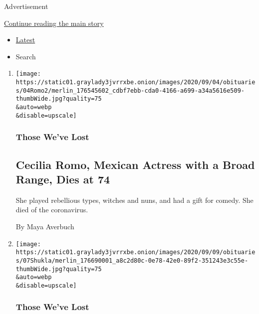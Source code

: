 Advertisement

\protect\hyperlink{after-mid2}{Continue reading the main story}

\begin{itemize}
\tightlist
\item
  \protect\hyperlink{stream-panel}{Latest}
\item
  Search
\end{itemize}

\begin{enumerate}
\def\labelenumi{\arabic{enumi}.}
\item
  \href{/2020/09/08/obituaries/cecilia-romo-dead-coronavirus.html}{}

  \texttt{[image: https://static01.graylady3jvrrxbe.onion/images/2020/09/04/obituaries/04Romo2/merlin\_176545602\_cdbf7ebb-cda0-4166-a699-a34a5616e509-thumbWide.jpg?quality=75\\\&auto=webp\\\&disable=upscale]}

  \hypertarget{those-weve-lost-1}{%
  \subsubsection{Those We've Lost}\label{those-weve-lost-1}}

  \hypertarget{cecilia-romo-mexican-actress-with-a-broad-range-dies-at-74}{%
  \subsection{Cecilia Romo, Mexican Actress with a Broad Range, Dies at
  74}\label{cecilia-romo-mexican-actress-with-a-broad-range-dies-at-74}}

  She played rebellious types, witches and nuns, and had a gift for
  comedy. She died of the coronavirus.

  By Maya Averbuch
\item
  \href{/2020/09/08/obituaries/neelanshu-shukla-dead-coronavirus.html}{}

  \texttt{[image: https://static01.graylady3jvrrxbe.onion/images/2020/09/09/obituaries/07Shukla/merlin\_176690001\_a8c2d80c-0e78-42e0-89f2-351243e3c55e-thumbWide.jpg?quality=75\\\&auto=webp\\\&disable=upscale]}

  \hypertarget{those-weve-lost-2}{%
  \subsubsection{Those We've Lost}\label{those-weve-lost-2}}

  \hypertarget{neelanshu-shukla-indian-television-journalist-dies-at-30}{%
}
\end{enumerate}
